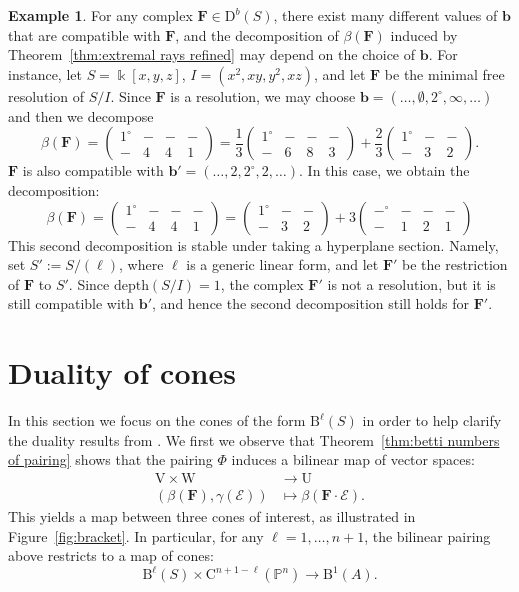 \documentclass[12pt]{amsart}
\theoremstyle{definition}
\newtheorem{example}[lemma]{Example}
\theoremstyle{remark}
\newcommand{\kk}{\Bbbk}
\newcommand{\PP}{\mathbb{P}}
\newcommand{\UU}{\mathrm{U}}
\newcommand{\VV}{\mathrm{V}}
\newcommand{\WW}{\mathrm{W}}
\newcommand{\bb}{\mathbf{b}}
\newcommand{\cE}{\mathcal{E}}
\newcommand{\FF}{\mathbf{F}}
\newcommand{\zp}{\circ}
\newcommand{\DD}{\mathrm{D}}
\newcommand{\CQ}{\mathrm{C}}
\newcommand{\BBQ}{\mathrm{B}}
\begin{document}
\begin{example}
For any complex $\FF\in \DD^b(S)$, there exist many different values of $\bb$ that are compatible with $\FF$, and the decomposition of $\beta(\FF)$ induced by Theorem~\ref{thm:extremal rays refined} may depend on the choice of $\bb$.   For instance, let $S=\kk[x,y,z]$, $I=(x^2,xy,y^2,xz)$, and let $\FF$ be the minimal free resolution of $S/I$.  Since $\FF$ is a resolution, we may choose $\bb=(\dots, \emptyset, 2^\zp, \infty, \dots)$ and then we decompose
\[
\beta(\FF)=\begin{pmatrix}
1^\zp&-&-&-\\
-&4&4&1
\end{pmatrix}
=
\frac{1}{3}
\begin{pmatrix}
1^\zp&-&-&-\\
-&6&8&3
\end{pmatrix}
+\frac{2}{3}
\begin{pmatrix}
1^\zp&-&-\\
-&3&2
\end{pmatrix}.
\]
$\FF$ is also compatible with $\bb'=(\dots, 2, 2^\zp, 2, \dots)$.  In this case, we obtain the decomposition:
\[
\beta(\FF)=
\begin{pmatrix}
1^\zp&-&-&-\\
-&4&4&1
\end{pmatrix}
=\begin{pmatrix}1^\zp&-&-\\-&3&2\end{pmatrix}
+
3\begin{pmatrix}
-^\zp&-&-&-\\
-&1&2&1
\end{pmatrix}
\] 
This second decomposition is stable under taking a hyperplane section.  Namely, set $S':=S/(\ell)$, where $\ell$ is a generic linear form, and let $\FF'$ be the restriction of $\FF$ to $S'$.  Since $\text{depth}(S/I)=1$, the complex $\FF'$ is not a resolution, but it is still compatible with $\bb'$, and hence the second decomposition still holds for $\FF'$.
\end{example}




\section{Duality of cones}\label{sec:duality}
In this section we focus on the cones of the form $\BBQ^\ell(S)$ in order to help clarify the duality results from \cite{eis-schrey1}.  We first we observe that Theorem~\ref{thm:betti numbers of pairing} shows that the pairing $\Phi$ induces a bilinear map of vector spaces:
\begin{align*}
\VV\times \WW & \to \UU\\
(\beta(\FF),\gamma(\cE))&\mapsto \beta(\FF\cdot \cE).
\end{align*}
This yields a map between three cones of interest, as illustrated in Figure~\ref{fig:bracket}.  In particular, for any $\ell=1, \dots, n+1$, the bilinear pairing above restricts to a map of cones:
\[
\BBQ^{\ell}(S)\times \CQ^{n+1-\ell}(\PP^n)\to \BBQ^1(A).
\]
\end{document}
